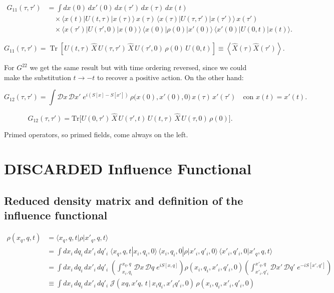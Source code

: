 \documentclass[12pt,a4paper,oneside]{article}
\numberwithin{equation}{section}   %
\begin{document}
\begin{align}
G_{11}(\tau,\tau')
&=
\int dx(0)\,dx'(0)\,dx(\tau')\,dx(\tau)\,dx(t)
\nonumber\\
&\quad\times
\langle x(t)|U(t,\tau)|x(\tau)\rangle\,
x(\tau)\,
\langle x(\tau)|U(\tau,\tau')|x(\tau')\rangle\,
x(\tau')
\nonumber\\
&\quad\times
\langle x(\tau')|U(\tau',0)|x(0)\rangle\,
\langle x(0)|\rho(0)|x'(0)\rangle\,
\langle x'(0)|U(0,t)|x(t)\rangle.
\end{align}

\begin{equation}
G_{11}(\tau,\tau')
=
\operatorname{Tr}
\!\left[
U(t,\tau)\,
\hat X\,
U(\tau,\tau')\,
\hat X\,
U(\tau',0)\,
\rho(0)\,
U(0,t)
\right]\equiv
\left\langle
\hat X(\tau)\hat X(\tau')
\right\rangle .
\end{equation}

For $G^{22}$ we get the same result but with time ordering reversed, since we 
could make the substitution $t\to -t$ to recover a positive action.
On the other hand:

\begin{equation}
G_{12}(\tau,\tau')
=
\int \mathcal{D}x\,\mathcal{D}x'\;
e^{i(S[x]-S[x'])}\,
\rho\!\big(x(0),x'(0),0\big)\,
x(\tau)\,x'(\tau')
\quad \text{con } x(t)=x'(t).
\end{equation}

\begin{equation}
G_{12}(\tau,\tau')
=
\mathrm{Tr}\Big[
U(0,\tau')\,\hat X\,
U(\tau',t)\,U(t,\tau)\,\hat X\,
U(\tau,0)\,\rho(0)
\Big].
\end{equation}

Primed operators, so primed fields, come always on the left. 

\section{DISCARDED Influence Functional}

\subsection{Reduced density matrix and definition of the influence functional}

\[
\begin{aligned}
\rho(x_q,q,t)
&= \langle x_q,q,t|\rho|x'_q,q,t\rangle \\
&= \int dx_i\,dq_i\,dx'_i\,dq'_i\;
\langle x_q,q,t|x_i,q_i,0\rangle\,
\langle x_i,q_i,0|\rho|x'_i,q'_i,0\rangle\,
\langle x'_i,q'_i,0|x'_q,q,t\rangle \\
&= \int dx_i\,dq_i\,dx'_i\,dq'_i\;
\left(\int_{x_i,q_i}^{x_q,q}\mathcal{D}x\,\mathcal{D}q\; e^{iS[x,q]}\right)
\rho(x_i,q_i,x'_i,q'_i,0)
\left(\int_{x'_i,q'_i}^{x'_q,q}\mathcal{D}x'\,\mathcal{D}q'\; e^{-iS[x',q']}\right) \\
&\equiv \int dx_i\,dq_i\,dx'_i\,dq'_i\;
\mathcal{J}(xq,x'q,\,t\,|\,x_iq_i,x'_iq'_i,0)\,
\rho(x_i,q_i,x'_i,q'_i,0)
\end{aligned}
\]
\end{document}
